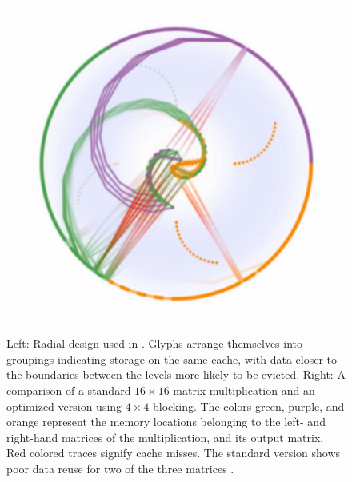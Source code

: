 \begin{figure}
\begin{subfigure}[c]{.24\linewidth}
	\end{subfigure}
	\begin{subfigure}[c]{.24\linewidth}
		\centering
		\includegraphics[width=\linewidth]{pictures/abstract_optimized.png}
	\end{subfigure}
	\caption{Left: Radial design used in \cite{choudhury2011abstract}. Glyphs arrange themselves into groupings indicating storage on the same cache, with data closer to the boundaries between the levels more likely to be evicted. Right: A comparison of a standard $16 \times 16$ matrix multiplication and an optimized version using $4 \times 4$ blocking. The colors green, purple, and orange represent the memory locations belonging to the left- and right-hand matrices of the multiplication, and its output matrix. Red colored traces signify cache misses. The standard version shows poor data reuse for two of the three matrices \cite{choudhury2011abstract}.}
	\label{fig:abstract_cache}
\end{figure}

